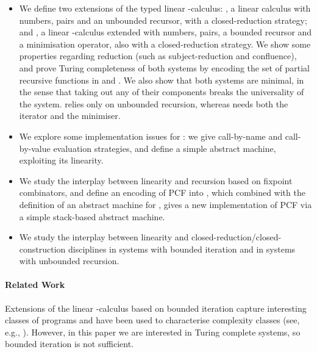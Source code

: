 \documentclass{article}
\begin{document}
\begin{itemize}
\item We define two extensions of the typed linear -calculus:
  , a linear calculus with numbers, pairs and an unbounded
  recursor, with a closed-reduction strategy; and , a linear
  -calculus extended with numbers, pairs, a bounded recursor
  and a minimisation operator, also with a closed-reduction
  strategy. We show some properties regarding reduction (such as
  subject-reduction and confluence), and prove Turing completeness of
  both systems by encoding the set of partial recursive functions in
   and . We also show that both systems are minimal, in
  the sense that taking out any of their components breaks the
  universality of the system.  relies only on unbounded
  recursion, whereas  needs both the iterator and the minimiser.

\item We explore some implementation issues for : we give
call-by-name and call-by-value evaluation strategies, and define a
simple abstract machine, exploiting its linearity.

\item We study the interplay between linearity and recursion based on
fixpoint combinators, and define an encoding of PCF into ,
which combined with the definition of an abstract machine for ,
gives a new implementation of PCF via a simple stack-based abstract
machine.

\item We study the interplay between linearity and
closed-reduction/closed-construction disciplines in systems with
bounded iteration and in systems with unbounded recursion.
\end{itemize}

\paragraph{Related Work}
Extensions of the linear -calculus based on bounded iteration
capture interesting classes of programs and have been used to
characterise complexity classes (see, e.g.,
\cite{G98,GirardJY:boull,AR02,BM04,H99,L04,T01}). However, in this
paper we are interested in Turing complete systems, so bounded
iteration is not sufficient.
\end{document}

